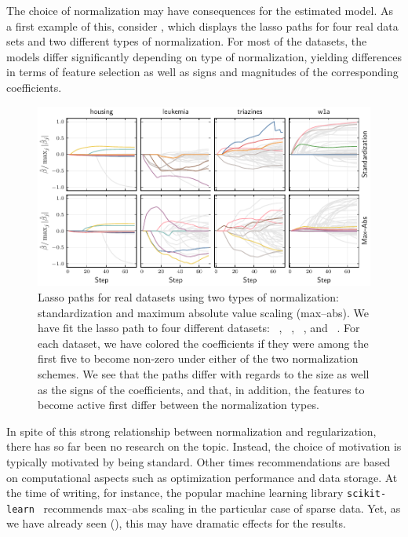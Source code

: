 The choice of normalization may have consequences for the estimated model. As a first
example of this, consider , which displays the lasso paths for
four real data sets and two different types of normalization. For most of the datasets, the
models differ significantly depending on type of normalization, yielding differences in
terms of feature selection as well as signs and magnitudes of the corresponding
coefficients.

\begin{figure}[bpt]
  \centering
  \includegraphics[]{plots/realdata_paths.pdf}
  \caption{%
    Lasso paths for real datasets using two types of normalization:
    standardization and maximum absolute value scaling (max--abs). We have fit
    the lasso path to four different datasets:
    ~\citep{harrison1978}, ~\citep{golub1999},
    ~\citep{king}, and ~\citep{platt1998}. For each
    dataset, we have colored the coefficients if they were among the first five
    to become non-zero under either of the two normalization schemes. We see
    that the paths differ with regards to the size as well as the signs of the
    coefficients, and that, in addition, the features to become active first
    differ between the normalization types.
  }
  \label{fig:realdata-paths}
\end{figure}

In spite of this strong relationship between normalization and regularization, there has so
far been no research on the topic. Instead, the choice of motivation is typically motivated
by being standard. Other times recommendations are based on computational aspects such as
optimization performance and data storage. At the time of writing, for instance, the
popular machine learning library \texttt{scikit-learn}~\citep{scikit-learndevelopers2024}
recommends max--abs scaling in the particular case of sparse data. Yet, as we have already
seen (), this may have dramatic effects for the results.

